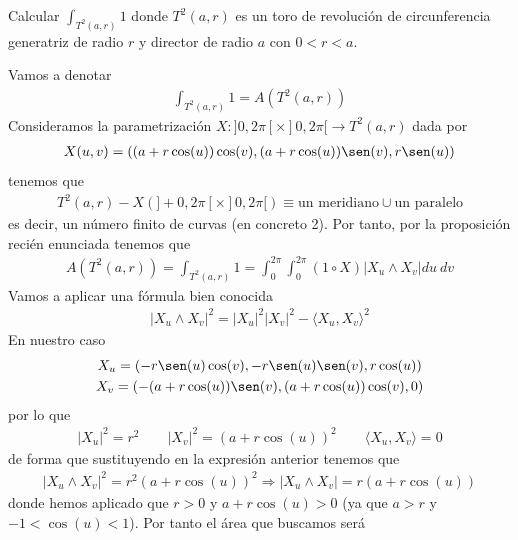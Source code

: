 \begin{ejemplo}
    Calcular $\displaystyle \int_{T^2(a,r)} 1$ donde $T^2(a,r)$ es un toro de revolución de circunferencia generatriz de radio $r$ y director de radio $a$ con $0<r<a$.\\

    \begin{solucion}
        Vamos a denotar
        \begin{gather*}
            \int_{T^2(a,r)} 1 = A(T^2(a,r))
        \end{gather*}
        Consideramos la parametrización $X:]0,2\pi[\times]0,2\pi[ \to T^2(a,r)$ dada por 
        \begin{gather*}
            X(u,v) = ((a+r\cos(u))\cos(v), (a+r\cos(u))\sen(v), r\sen(u))
        \end{gather*}
        tenemos que 
        \begin{gather*}
            T^2(a,r) - X(]+0,2\pi[\times]0,2\pi[) \equiv \text{un meridiano} \cup \text{un paralelo}
        \end{gather*}
        es decir, un número finito de curvas (en concreto 2). Por tanto, por la proposición recién enunciada tenemos que 
        \begin{gather*}
            A(T^2(a,r)) = \int_{T^2(a,r)} 1 = \int_0^{2\pi} \int_0^{2\pi} (1\circ X) |X_u \wedge X_v| du\ dv
        \end{gather*}
        Vamos a aplicar una fórmula bien conocida
        \begin{gather*}
            |X_u \wedge X_v|^2 = |X_u|^2 |X_v|^2 - \langle X_u, X_v \rangle^2
        \end{gather*}
        En nuestro caso
        \begin{gather*}
            X_u = (-r\sen(u)\cos(v), -r\sen(u)\sen(v), r\cos(u))\\
            X_v = (-(a+r\cos(u))\sen(v), (a+r\cos(u))\cos(v), 0)
        \end{gather*}
        por lo que 
        \begin{gather*}
            |X_u|^2 = r^2 \qquad |X_v|^2 = (a+r\cos(u))^2 \qquad \langle X_u, X_v\rangle = 0
        \end{gather*}
        de forma que sustituyendo en la expresión anterior tenemos que 
        \begin{gather*}
            |X_u\wedge X_v|^2 = r^2(a+r\cos(u))^2 \Rightarrow |X_u\wedge X_v| = r(a+r\cos(u))
        \end{gather*}
        donde hemos aplicado que $r > 0$ y $a+r\cos(u)>0$ (ya que $a>r$ y $-1 < \cos(u) < 1$). Por tanto el área que buscamos será

\end{solucion}
\end{ejemplo}
